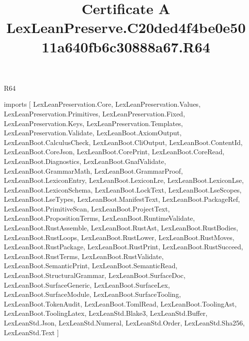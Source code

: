 \begin{lexlean}{R64}
\title{Certificate A LexLeanPreserve.C20ded4f4be0e5011a640fb6c30888a67.R64}
\begin{coremodule}
imports [
  LexLeanPreservation.Core,
  LexLeanPreservation.Values,
  LexLeanPreservation.Primitives,
  LexLeanPreservation.Fixed,
  LexLeanPreservation.Keys,
  LexLeanPreservation.Templates,
  LexLeanPreservation.Validate,
  LexLeanBoot.AxiomOutput,
  LexLeanBoot.CalculusCheck,
  LexLeanBoot.CliOutput,
  LexLeanBoot.ContentId,
  LexLeanBoot.CoreJson,
  LexLeanBoot.CorePrint,
  LexLeanBoot.CoreRead,
  LexLeanBoot.Diagnostics,
  LexLeanBoot.GnafValidate,
  LexLeanBoot.GrammarMath,
  LexLeanBoot.GrammarProof,
  LexLeanBoot.LexiconEntry,
  LexLeanBoot.LexiconLre,
  LexLeanBoot.LexiconLse,
  LexLeanBoot.LexiconSchema,
  LexLeanBoot.LockText,
  LexLeanBoot.LseScopes,
  LexLeanBoot.LseTypes,
  LexLeanBoot.ManifestText,
  LexLeanBoot.PackageRef,
  LexLeanBoot.PrimitiveScan,
  LexLeanBoot.ProjectText,
  LexLeanBoot.PropositionTerms,
  LexLeanBoot.RuntimeValidate,
  LexLeanBoot.RustAssemble,
  LexLeanBoot.RustAst,
  LexLeanBoot.RustBodies,
  LexLeanBoot.RustLoops,
  LexLeanBoot.RustLower,
  LexLeanBoot.RustMoves,
  LexLeanBoot.RustPackage,
  LexLeanBoot.RustPrint,
  LexLeanBoot.RustSucceed,
  LexLeanBoot.RustTerms,
  LexLeanBoot.RustValidate,
  LexLeanBoot.SemanticPrint,
  LexLeanBoot.SemanticRead,
  LexLeanBoot.StructuralGrammar,
  LexLeanBoot.SurfaceDoc,
  LexLeanBoot.SurfaceGeneric,
  LexLeanBoot.SurfaceLex,
  LexLeanBoot.SurfaceModule,
  LexLeanBoot.SurfaceTooling,
  LexLeanBoot.TokenAudit,
  LexLeanBoot.TomlRead,
  LexLeanBoot.ToolingAst,
  LexLeanBoot.ToolingLatex,
  LexLeanStd.Blake3,
  LexLeanStd.Buffer,
  LexLeanStd.Json,
  LexLeanStd.Numeral,
  LexLeanStd.Order,
  LexLeanStd.Sha256,
  LexLeanStd.Text
]


\end{coremodule}
\end{lexlean}
